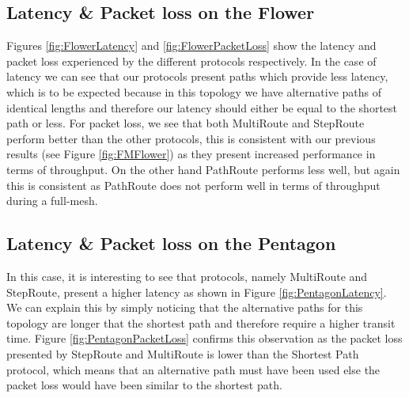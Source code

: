 \subsection{Latency \& Packet loss on the Flower}



Figures \ref{fig:FlowerLatency} and \ref{fig:FlowerPacketLoss} show the latency and packet loss experienced by the different protocols respectively. In the case of latency we can see that our protocols present paths which provide less latency, which is to be expected because in this topology we have alternative paths of identical lengths and therefore our latency should either be equal to the shortest path or less. For packet loss, we see that both MultiRoute and StepRoute perform better than the other protocols, this is consistent with our previous results (see Figure \ref{fig:FMFlower}) as they present increased performance in terms of throughput. On the other hand PathRoute performs less well, but again this is consistent as PathRoute does not perform well in terms of throughput during a full-mesh.

\subsection{Latency \& Packet loss on the Pentagon}



In this case, it is interesting to see that protocols, namely MultiRoute and StepRoute, present a higher latency as shown in Figure \ref{fig:PentagonLatency}. We can explain this by simply noticing that the alternative paths for this topology are longer that the shortest path and therefore require a higher transit time. Figure \ref{fig:PentagonPacketLoss} confirms this observation as the packet loss presented by StepRoute and MultiRoute is lower than the Shortest Path protocol, which means that an alternative path must have been used else the packet loss would have been similar to the shortest path.

